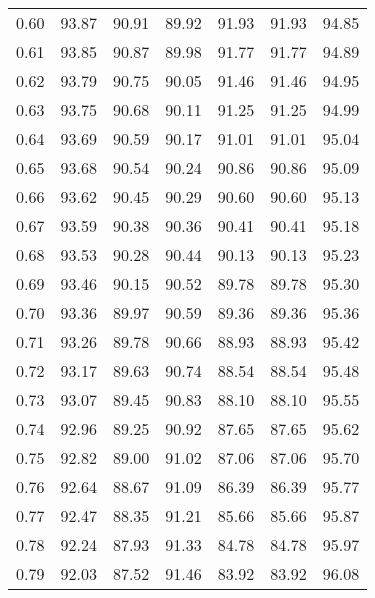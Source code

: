 \begin{tabular}{|c|c|c|c|c|c|c|}
      0.60 &     93.87 &     90.91 &      89.92 &   91.93 &      91.93 &         94.85 \\
      0.61 &     93.85 &     90.87 &      89.98 &   91.77 &      91.77 &         94.89 \\
      0.62 &     93.79 &     90.75 &      90.05 &   91.46 &      91.46 &         94.95 \\
      0.63 &     93.75 &     90.68 &      90.11 &   91.25 &      91.25 &         94.99 \\
      0.64 &     93.69 &     90.59 &      90.17 &   91.01 &      91.01 &         95.04 \\
      0.65 &     93.68 &     90.54 &      90.24 &   90.86 &      90.86 &         95.09 \\
      0.66 &     93.62 &     90.45 &      90.29 &   90.60 &      90.60 &         95.13 \\
      0.67 &     93.59 &     90.38 &      90.36 &   90.41 &      90.41 &         95.18 \\
      0.68 &     93.53 &     90.28 &      90.44 &   90.13 &      90.13 &         95.23 \\
      0.69 &     93.46 &     90.15 &      90.52 &   89.78 &      89.78 &         95.30 \\
      0.70 &     93.36 &     89.97 &      90.59 &   89.36 &      89.36 &         95.36 \\
      0.71 &     93.26 &     89.78 &      90.66 &   88.93 &      88.93 &         95.42 \\
      0.72 &     93.17 &     89.63 &      90.74 &   88.54 &      88.54 &         95.48 \\
      0.73 &     93.07 &     89.45 &      90.83 &   88.10 &      88.10 &         95.55 \\
      0.74 &     92.96 &     89.25 &      90.92 &   87.65 &      87.65 &         95.62 \\
      0.75 &     92.82 &     89.00 &      91.02 &   87.06 &      87.06 &         95.70 \\
      0.76 &     92.64 &     88.67 &      91.09 &   86.39 &      86.39 &         95.77 \\
      0.77 &     92.47 &     88.35 &      91.21 &   85.66 &      85.66 &         95.87 \\
      0.78 &     92.24 &     87.93 &      91.33 &   84.78 &      84.78 &         95.97 \\
      0.79 &     92.03 &     87.52 &      91.46 &   83.92 &      83.92 &         96.08 \\

\end{tabular}
